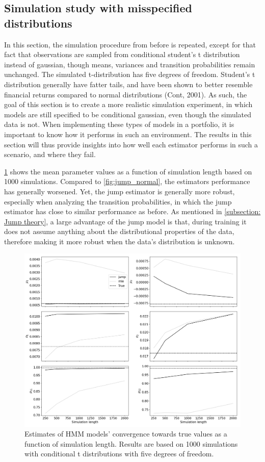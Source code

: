 \subsection{Simulation study with misspecified distributions}

In this section, the simulation procedure from before is repeated, except for that fact that observations are sampled from conditional student's t distribution instead of gaussian, though means, variances and transition probabilities remain unchanged. The simulated t-distribution has five degrees of freedom. Student's t distribution generally have fatter tails, and have been shown to better resemble financial returns compared to normal distributions (Cont, 2001). As such, the goal of this section is to create a more realistic simulation experiment, in which models are still specified to be conditional gaussian, even though the simulated data is not. When implementing these types of models in a portfolio, it is important to know how it performs in such an environment. The results in this section will thus provide insights into how well each estimator performs in such a scenario, and where they fail.

\cref{fig:jump_t} shows the mean parameter values as a function of simulation length based on 1000 simulations. Compared to \cref{fig:jump_normal}, the estimators performance has generally worsened. Yet, the jump estimator is generally more robust, especially when analyzing the transition probabilities, in which the jump estimator has close to similar performance as before. As mentioned in \cref{subsection: Jump theory}, a large advantage of the jump model is that, during training it does not assume anything about the distributional properties of the data, therefore making it more robust when the data's distribution is unknown.

\begin{figure}[H] 
    \centering
    \includegraphics[width=1\textwidth]{analysis/model_convergence/images/simulation_t.png}
    \caption{Estimates of HMM models' convergence towards true values as a function of simulation length. Results are based on 1000 simulations with conditional t distributions with five degrees of freedom.}
    \label{fig:jump_t}
\end{figure}


